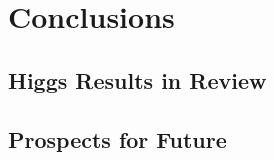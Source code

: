 \chapter[Conclusions][Conclusions]{Conclusions}
\section{Higgs Results in Review}
\section{Prospects for Future }



